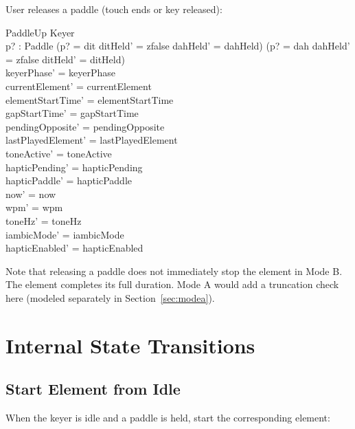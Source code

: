 \documentclass[a4paper,10pt,fleqn]{article}
\begin{document}
User releases a paddle (touch ends or key released):

\begin{schema}{PaddleUp}
\Delta Keyer \\
p? : Paddle
\where
(p? = dit \land ditHeld' = zfalse \land dahHeld' = dahHeld) \lor
(p? = dah \land dahHeld' = zfalse \land ditHeld' = ditHeld) \\
keyerPhase' = keyerPhase \\
currentElement' = currentElement \\
elementStartTime' = elementStartTime \\
gapStartTime' = gapStartTime \\
pendingOpposite' = pendingOpposite \\
lastPlayedElement' = lastPlayedElement \\
toneActive' = toneActive \\
hapticPending' = hapticPending \\
hapticPaddle' = hapticPaddle \\
now' = now \\
wpm' = wpm \\
toneHz' = toneHz \\
iambicMode' = iambicMode \\
hapticEnabled' = hapticEnabled
\end{schema}

Note that releasing a paddle does not immediately stop the element in Mode B.
The element completes its full duration. Mode A would add a truncation check
here (modeled separately in Section~\ref{sec:modea}).

\section{Internal State Transitions}

\subsection{Start Element from Idle}

When the keyer is idle and a paddle is held, start the corresponding element:
\end{document}
